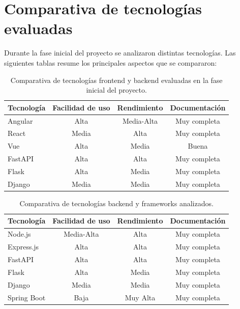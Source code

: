 \section{Comparativa de tecnologías evaluadas}

Durante la fase inicial del proyecto se analizaron distintas tecnologías. Las siguientes tablas resume los principales aspectos que se compararon:

\begin{table}[H]
\centering
\begin{tabular}{|l|c|c|c|}
\hline
\textbf{Tecnología} & \textbf{Facilidad de uso} & \textbf{Rendimiento} & \textbf{Documentación} \\
\hline
Angular & Alta & Media-Alta & Muy completa \\
React & Media & Alta & Muy completa \\
Vue & Alta & Media & Buena \\
FastAPI & Alta & Alta & Muy completa \\
Flask & Alta & Media & Muy completa \\
Django & Media & Media & Muy completa \\
\hline
\end{tabular}
\caption{Comparativa de tecnologías frontend y backend evaluadas en la fase inicial del proyecto.}
\label{tabla:frontend-backend1}
\end{table}


\begin{table}[H]
\centering
\begin{tabular}{|l|c|c|c|}
\hline
\textbf{Tecnología} & \textbf{Facilidad de uso} & \textbf{Rendimiento} & \textbf{Documentación} \\
\hline
Node.js & Media-Alta & Alta & Muy completa \\
Express.js & Alta & Alta & Muy completa \\
FastAPI & Alta & Alta & Muy completa \\
Flask & Alta & Media & Muy completa \\
Django & Media & Media & Muy completa \\
Spring Boot & Baja & Muy Alta & Muy completa \\
\hline
\end{tabular}
\caption{Comparativa de tecnologías backend y frameworks analizados.}
\label{tabla:backend-frameworks}
\end{table}


